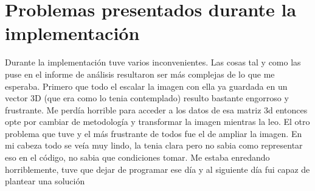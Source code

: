 \documentclass{article}
\begin{document}
\section{Problemas presentados durante la implementación}
Durante la implementación tuve varios inconvenientes. Las cosas tal y como las puse en el informe de análisis resultaron ser más complejas de lo que me esperaba. Primero que todo el escalar la imagen con ella ya guardada en un vector 3D (que era como lo tenia contemplado) resulto bastante engorroso y frustrante. Me perdía horrible para acceder a los datos de esa matriz 3d entonces opte por cambiar de metodología y transformar la imagen mientras la leo. El otro problema que tuve y el más frustrante de todos fue el de ampliar la imagen. En mi cabeza todo se veía muy lindo, la tenia clara pero no sabia como representar eso en el código, no sabia que condiciones tomar. Me estaba enredando horriblemente, tuve que dejar de programar ese día y al siguiente día fui capaz de plantear una solución
    
\end{document}
